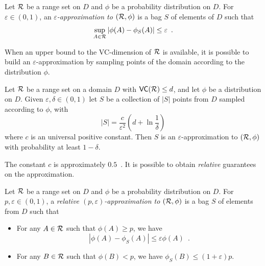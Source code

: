 \begin{definition}\label{def:eapprox}
  Let $\mathcal{R}$ be a range set on %
  $D$ and $\phi$ be a probability distribution on $D$. For $\varepsilon\in(0,1)$,
  an \emph{$\varepsilon$-approximation to $(\mathcal{R},\phi)$} is a bag $S$ of
  elements of $D$ such that 
  \[
  \sup_{A\in\mathcal{R}}|\phi(A)-\phi_S(A)|\le\varepsilon\enspace.\]
\end{definition}

When an upper bound to the VC-dimension of $\mathcal{R}$ is available, it is possible
to build an $\varepsilon$-approximation by sampling points of
the domain according to the distribution $\phi$.

\begin{theorem}\label{thm:eapprox}
  Let $\mathcal{R}$ be a range set on a domain $D$ with
  $\mathsf{VC}(\mathcal{R})\le d$, and let $\phi$ be a distribution on $D$. Given
  $\varepsilon,\delta\in(0,1)$ let $S$ be a collection of $|S|$ points from $D$
  sampled according to $\phi$, with
  \begin{equation}\label{eq:vceapprox}
	|S|=\frac{c}{\varepsilon^2}\left(d+\ln\frac{1}{\delta}\right)
  \end{equation}
  where $c$ is an universal positive constant. Then $S$ is an
  $\varepsilon$-approximation to $(\mathcal{R},\phi)$ with probability at least
  $1-\delta$.
\end{theorem}
The constant $c$ is approximately $0.5$~\citep{LofflerP09}.
It is possible to obtain \emph{relative} guarantees on the approximation.
\begin{definition}\label{def:releapprox}
  Let $\mathcal{R}$ be a range set on $D$ and $\phi$ be a probability distribution on
  $D$. For $p,\varepsilon\in (0,1)$, a \emph{relative
  $(p,\varepsilon)$-approximation to $(\mathcal{R},\phi)$} is a bag $S$ of elements
  from $D$ such that 
  \begin{itemize}
    \item For any $A\in\mathcal{R}$ such that $\phi(A)\ge p$, we have 
      \[ |\phi(A) - \phi_S(A)|\le \varepsilon\phi(A)\enspace.\]
    \item For any $B\in\mathcal{R}$ such that $\phi(B)< p$, we have $\phi_S(B)\le
      (1+\varepsilon)p$.
  \end{itemize}
\end{definition}

